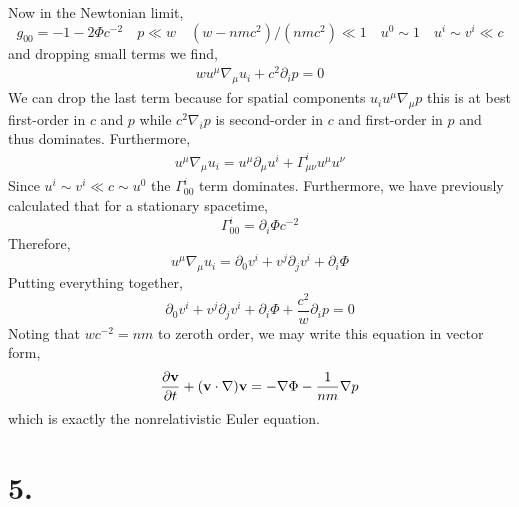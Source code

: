 \documentclass[12pt]{article}
\begin{document}
Now in the Newtonian limit,
\[ g_{00} = - 1 - 2 \Phi c^{-2} \quad p \ll w \quad (w - n m c^2)/(nm c^2) \ll 1 \quad u^0 \sim 1  \quad u^i \sim v^i \ll c \]
and dropping small terms we find,
\begin{align*}
w u^\mu \nabla_\mu u_i + c^2 \partial_i p = 0 
\end{align*}
We can drop the last term because for spatial components $u_i u^\mu \nabla_\mu p$ this is at best first-order in $c$ and $p$ while $c^2 \nabla_i p$ is second-order in $c$ and first-order in $p$ and thus dominates. Furthermore, 
\begin{align*}
u^\mu \nabla_\mu u_i = u^\mu \partial_\mu u^i + \Gamma^i_{\mu \nu} u^{\mu} u^{\nu} 
\end{align*}
Since $u^i \sim v^i \ll c \sim u^0$ the $\Gamma^i_{00}$ term dominates. Furthermore, we have previously calculated that for a stationary spacetime,
\[ \Gamma^i_{00} = \partial_i \Phi c^{-2} \]
Therefore,
\[ u^\mu \nabla_\mu u_i = \partial_0 v^i + v^j \partial_j v^i + \partial_i \Phi \]
Putting everything together,
\[ \partial_0 v^i + v^j \partial_j v^i + \partial_i \Phi + \frac{c^2}{w} \partial_i p = 0 \]
Noting that $w c^{-2} = n m$ to zeroth order, we may write this equation in vector form,
\[ \frac{\partial{\mathbf{v}}}{\partial{t}} + (\mathbf{v} \cdot \nabla) \mathbf{v}  = - \nabla \Phi - \frac{1}{nm} \nabla p \]
which is exactly the nonrelativistic Euler equation. 

\section*{5. }
\end{document}
